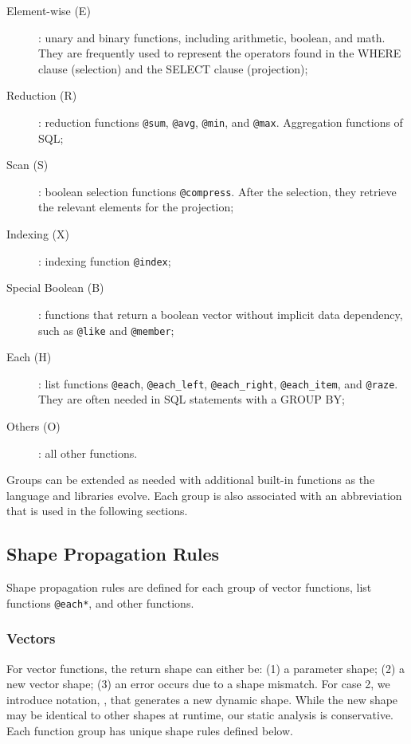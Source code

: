 \begin{description}
\item[Element-wise (E)]:
    unary and binary functions, including arithmetic, boolean, and math. They are frequently used to represent the operators found in the WHERE clause (selection) and the SELECT clause (projection);

\item[Reduction (R)]:
    reduction functions \texttt{@sum}, \texttt{@avg}, \texttt{@min}, and \texttt{@max}. Aggregation functions of SQL;

\item[Scan (S)]:
    boolean selection functions \texttt{@compress}. After the selection, they retrieve the relevant elements for the projection;

\item[Indexing (X)]:
    indexing function \texttt{@index};

\item[Special Boolean (B)]:
    functions that return a boolean vector without implicit data dependency, such as
    \texttt{@like} and \texttt{@member};

\item[Each (H)]:
    list functions \texttt{@each}, \texttt{@each_left}, \texttt{@each_right},
    \texttt{@each_item}, and \texttt{@raze}. They are often needed in SQL statements with a GROUP BY;

\item[Others (O)]:
    all other functions.
\end{description}
Groups can be extended as needed with additional built-in functions as
the language and libraries evolve. Each group is also associated with
an abbreviation that is used in the following sections.

\subsection{Shape Propagation Rules} \label{SubSec:propagation}

Shape propagation rules are defined for each group of vector functions,
list functions \texttt{@each*}, and other functions.

\subsubsection{Vectors}

For vector functions, the return shape can either be:
(1) a parameter shape;
(2) a new vector shape;
(3) an error occurs due to a shape mismatch.
For case 2, we introduce notation, \shapeN{}, that generates a new dynamic shape.
While the new shape may be identical to other shapes at runtime, our static
analysis is conservative. Each function group has unique shape rules defined below.

